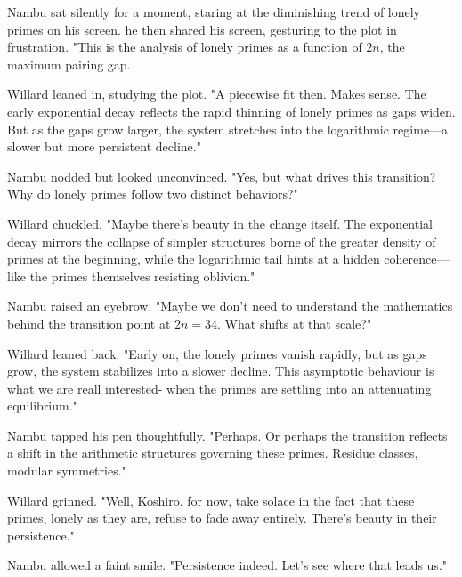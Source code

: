 Nambu sat silently for a moment, staring at the diminishing trend of lonely primes on his screen. he then shared his screen, gesturing to the plot in frustration. "This is the analysis of lonely primes as a function of \(2n\), the maximum pairing gap.


Willard leaned in, studying the plot. "A piecewise fit then. Makes sense. The early exponential decay reflects the rapid thinning of lonely primes as gaps widen. But as the gaps grow larger, the system stretches into the logarithmic regime—a slower but more persistent decline."

\bigskip

Nambu nodded but looked unconvinced. "Yes, but what drives this transition? Why do lonely primes follow two distinct behaviors?"
\bigskip

Willard chuckled. "Maybe there’s beauty in the change itself. The exponential decay mirrors the collapse of simpler structures borne of the greater density of primes at the beginning, while the logarithmic tail hints at a hidden coherence—like the primes themselves resisting oblivion."
\bigskip

Nambu raised an eyebrow. "Maybe we don't need to understand the mathematics behind the transition point at \(2n = 34\). What shifts at that scale?"


Willard leaned back. "Early on, the lonely primes vanish rapidly, but as gaps grow, the system stabilizes into a slower decline. This asymptotic behaviour is what we are reall interested- when the primes are settling into an attenuating equilibrium."
\bigskip

Nambu tapped his pen thoughtfully. "Perhaps. Or perhaps the transition reflects a shift in the arithmetic structures governing these primes. Residue classes, modular symmetries."
\bigskip

Willard grinned. "Well, Koshiro, for now, take solace in the fact that these primes, lonely as they are, refuse to fade away entirely. There’s beauty in their persistence."
\bigskip

Nambu allowed a faint smile. "Persistence indeed. Let’s see where that leads us."


